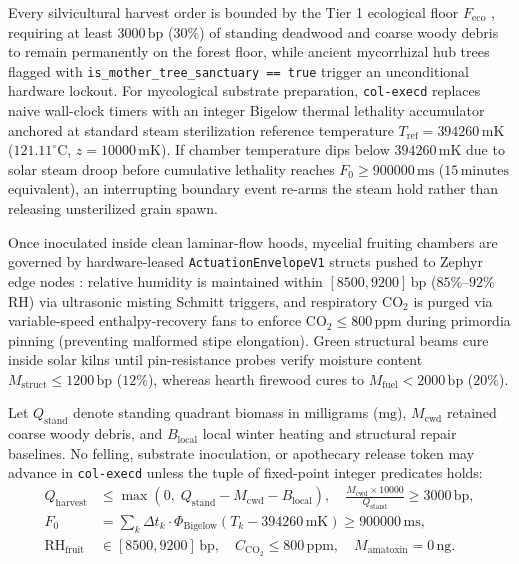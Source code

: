 Every silvicultural harvest order is bounded by the Tier 1 ecological floor $F_{\mathrm{eco}}$ \parencite{rockstrom2009safe}, requiring at least
$3000\,\mathrm{bp}$ ($30\%$) of standing deadwood and coarse woody debris to remain permanently on the forest floor, while ancient mycorrhizal
hub trees flagged with \texttt{is\_mother\_tree\_sanctuary == true} trigger an unconditional hardware lockout. For mycological substrate
preparation, \texttt{col-execd} replaces naive wall-clock timers with an integer Bigelow thermal lethality accumulator
\parencite{bigelow1921thermal} anchored at standard steam sterilization reference temperature $T_{\mathrm{ref}} = 394260\,\mathrm{mK}$
($121.11^\circ\mathrm{C}$, $z = 10000\,\mathrm{mK}$). If chamber temperature dips below $394260\,\mathrm{mK}$ due to solar steam droop before
cumulative lethality reaches $F_0 \ge 900000\,\mathrm{ms}$ ($15\,\mathrm{minutes}$ equivalent), an interrupting boundary event re-arms the steam
hold rather than releasing unsterilized grain spawn.

Once inoculated inside clean laminar-flow hoods, mycelial fruiting chambers are governed by hardware-leased \texttt{ActuationEnvelopeV1} structs
pushed to Zephyr edge nodes \parencite{astrom2008feedback}: relative humidity is maintained within $[8500, 9200]\,\mathrm{bp}$
($85\%\text{--}92\%$ RH) via ultrasonic misting Schmitt triggers, and respiratory $\mathrm{CO}_2$ is purged via variable-speed enthalpy-recovery
fans to enforce $\mathrm{CO}_2 \le 800\,\mathrm{ppm}$ during primordia pinning (preventing malformed stipe elongation). Green structural beams
cure inside solar kilns until pin-resistance probes verify moisture content $M_{\mathrm{struct}} \le 1200\,\mathrm{bp}$ ($12\%$), whereas hearth
firewood cures to $M_{\mathrm{fuel}} < 2000\,\mathrm{bp}$ ($20\%$).

\begin{invariant}
\label{inv:eta-gates}
Let $Q_{\mathrm{stand}}$ denote standing quadrant biomass in milligrams ($\mathrm{mg}$), $M_{\mathrm{cwd}}$ retained coarse woody debris, and
$B_{\mathrm{local}}$ local winter heating and structural repair baselines. No felling, substrate inoculation, or apothecary release token may
advance in \texttt{col-execd} unless the tuple of fixed-point integer predicates holds:
\begin{align}
Q_{\mathrm{harvest}} &\le \max\!\left(0,\; Q_{\mathrm{stand}} - M_{\mathrm{cwd}} - B_{\mathrm{local}}\right), \quad \frac{M_{\mathrm{cwd}} \times 10000}{Q_{\mathrm{stand}}} \ge 3000\,\mathrm{bp}, \\
F_0 &= \sum_{k} \Delta t_k \cdot \Phi_{\mathrm{Bigelow}}\!\left(T_k - 394260\,\mathrm{mK}\right) \ge 900000\,\mathrm{ms}, \\
\mathrm{RH}_{\mathrm{fruit}} &\in [8500, 9200]\,\mathrm{bp}, \quad C_{\mathrm{CO_2}} \le 800\,\mathrm{ppm}, \quad M_{\mathrm{amatoxin}} = 0\,\mathrm{ng}.
\end{align}
\end{invariant}

